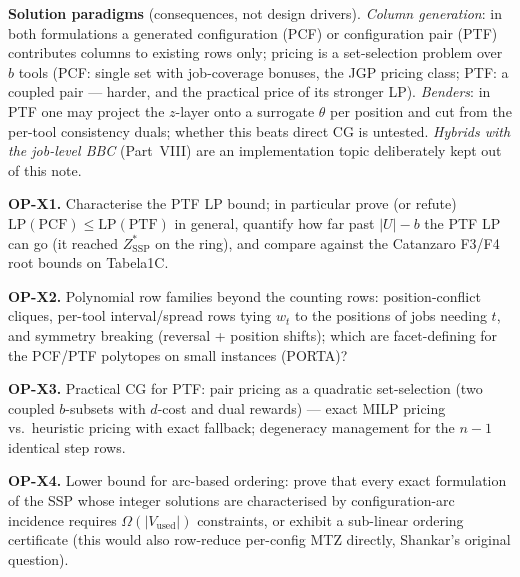 \documentclass[11pt,a4paper]{article}
\theoremstyle{plain}
\theoremstyle{definition}
\newcommand{\ZSSP}{Z_{\mathrm{SSP}}^{*}}
\begin{document}
\textbf{Solution paradigms} (consequences, not design drivers). \emph{Column
generation}: in both formulations a generated configuration (PCF) or configuration
pair (PTF) contributes columns to existing rows only; pricing is a set-selection
problem over $b$ tools (PCF: single set with job-coverage bonuses, the JGP pricing
class; PTF: a coupled pair --- harder, and the practical price of its stronger LP).
\emph{Benders}: in PTF one may project the $z$-layer onto a surrogate $\theta$ per
position and cut from the per-tool consistency duals; whether this beats direct CG
is untested. \emph{Hybrids with the job-level BBC} (Part~VIII) are an implementation
topic deliberately kept out of this note.

\begin{openproblem}
\textbf{OP-X1.} Characterise the PTF LP bound; in particular prove (or refute)
$\mathrm{LP(PCF)}\le\mathrm{LP(PTF)}$ in general, quantify how far past $|U|-b$ the
PTF LP can go (it reached $\ZSSP$ on the ring), and compare against the Catanzaro
F3/F4 root bounds on Tabela1C.
\end{openproblem}
\begin{openproblem}
\textbf{OP-X2.} Polynomial row families beyond the counting rows: position-conflict
cliques, per-tool interval/spread rows tying $w_t$ to the positions of jobs needing
$t$, and symmetry breaking (reversal + position shifts); which are facet-defining for
the PCF/PTF polytopes on small instances (PORTA)?
\end{openproblem}
\begin{openproblem}
\textbf{OP-X3.} Practical CG for PTF: pair pricing as a quadratic set-selection
(two coupled $b$-subsets with $d$-cost and dual rewards) --- exact MILP pricing
vs.\ heuristic pricing with exact fallback; degeneracy management for the $n-1$
identical step rows.
\end{openproblem}
\begin{openproblem}
\label{op:x4}
\textbf{OP-X4.} Lower bound for arc-based ordering: prove that every exact
formulation of the SSP whose integer solutions are characterised by
configuration-arc incidence requires $\Omega(|V_{\mathrm{used}}|)$ constraints, or
exhibit a sub-linear ordering certificate (this would also row-reduce per-config
MTZ directly, Shankar's original question).
\end{openproblem}



\end{document}
